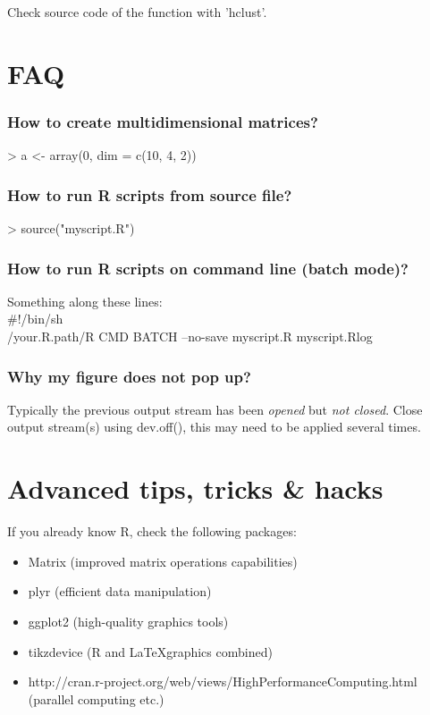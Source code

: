 \documentclass[10pt,a4paper]{article}
\begin{document}
Check source code of the function with 'hclust'.

\section{FAQ}

\subsubsection*{How to create multidimensional matrices?} 

\begin{Schunk}
\begin{Sinput}
> a <- array(0, dim = c(10, 4, 2))
\end{Sinput}
\end{Schunk}

\subsubsection*{How to run R scripts from source file?}

\begin{Schunk}
\begin{Sinput}
> source("myscript.R")
\end{Sinput}
\end{Schunk}

\subsubsection*{How to run R scripts on command line (batch mode)?} 

Something along these lines:\\
\#!/bin/sh\\
/your.R.path/R CMD BATCH --no-save myscript.R myscript.Rlog


\subsubsection*{Why my figure does not pop up?} 

Typically the previous output stream has been {\it opened} but {\it
not closed}. Close output stream(s) using dev.off(), this may need to
be applied several times.

\section{Advanced tips, tricks \& hacks} 

If you already know R, check the following packages:

\begin{itemize}
\item Matrix (improved matrix operations capabilities)
\item plyr (efficient data manipulation)
\item ggplot2 (high-quality graphics tools)
\item tikzdevice (R and \LaTeX graphics combined)
\item http://cran.r-project.org/web/views/HighPerformanceComputing.html (parallel computing etc.)
\end{itemize}


\end{document}
